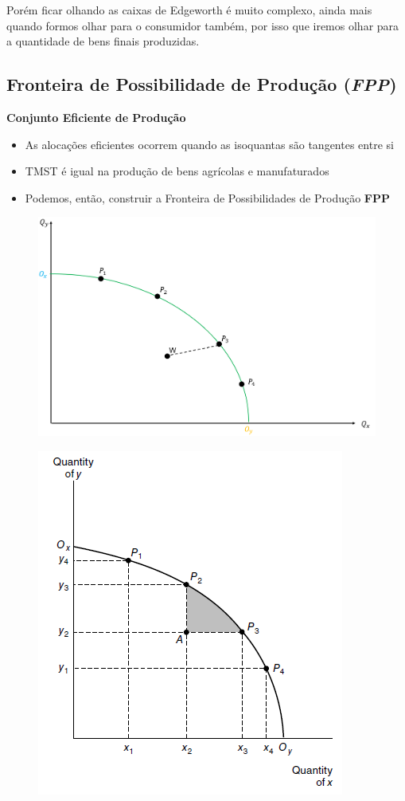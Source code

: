 \documentclass[a4paper,12pt]{article}[abntex2]
\begin{document}
Porém ficar olhando as caixas de Edgeworth é muito complexo, ainda mais quando formos olhar para o consumidor também, por isso que iremos olhar para a quantidade de bens finais produzidas.

\subsection{\textbf{Fronteira de Possibilidade de Produção (\textit{FPP})}}

\textbf{Conjunto Eficiente de Produção}\begin{itemize}
    \item As alocações eficientes ocorrem quando as isoquantas são tangentes entre si
    \item TMST é igual na produção de bens agrícolas e manufaturados 
    \item Podemos, então, construir a Fronteira de Possibilidades de Produção \textbf{FPP}
\end{itemize}

\begin{figure}[H]
    \centering
    \includegraphics[width=0.7\linewidth]{Imagens/a5i4.png}
\end{figure}

\begin{figure}[H]
    \centering
    \includegraphics[width=0.70\linewidth]{Imagens/a3i3.png}
\end{figure}
\end{document}
